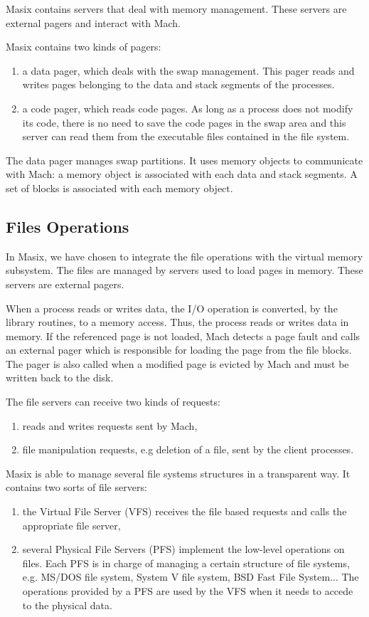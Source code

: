 	Masix contains servers that deal with memory management. These
servers are external pagers and interact with Mach.

	Masix contains two kinds of pagers:
\begin {enumerate}
\item a data pager, which deals with the swap management. This pager reads
and writes pages belonging to the data and stack segments of the processes.
\item a code pager, which reads code pages. As long as a process does not
modify its code, there is no need to save the code pages in the swap area and
this server can read them from the executable files contained in the file
system.
\end {enumerate}

	The data pager manages swap partitions. It uses memory objects to
communicate with Mach: a memory object is associated with each data and
stack segments. A set of blocks is associated with each memory object.

\subsection {Files Operations}
\label {subsection:files}

	In Masix, we have chosen to integrate the file operations with the
virtual memory subsystem. The files are managed by servers used to
load pages in memory. These servers are external pagers.

	When a process reads or writes data, the I/O operation is converted,
by the library routines, to a memory access. Thus, the process reads or
writes data in memory. If the referenced page is not loaded, Mach detects
a page fault and calls an external pager which is responsible for loading
the page from the file blocks. The pager is also called when a modified
page is evicted by Mach and must be written back to the disk.

	The file servers can receive two kinds of requests:
\begin {enumerate}
\item reads and writes requests sent by Mach,
\item file manipulation requests, e.g deletion of a file, sent by the
client processes.
\end {enumerate}

	Masix is able to manage several file systems structures in a
transparent way. It contains two sorts of file servers:
\begin {enumerate}
\item the Virtual File Server (VFS) receives the file based requests and
calls the appropriate file server,
\item several Physical File Servers (PFS) implement the low-level operations
on files. Each PFS is in charge of managing a certain structure of file
systems, e.g. MS/DOS file system, System V file system, BSD Fast File System...
The operations provided by a PFS are used by the VFS when it needs to accede
to the physical data.
\end {enumerate}

